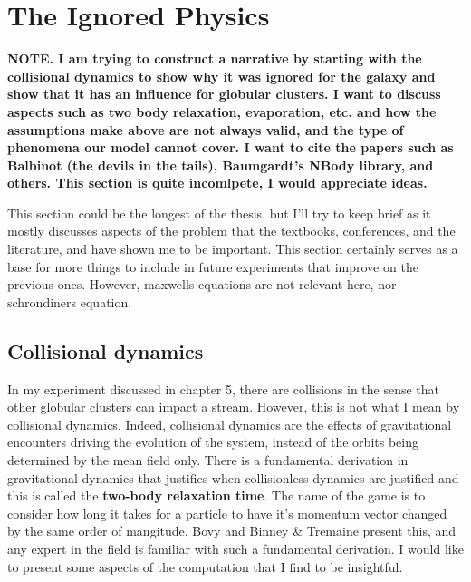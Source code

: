 \section{The Ignored Physics} \label{sec:ignoredphysics}


    \textbf{NOTE. I am trying to construct a narrative by starting with the collisional dynamics to show why it was ignored for the galaxy and show that it has an influence for globular clusters. I want to discuss aspects such as two body relaxation, evaporation, etc. and how the assumptions make above are not always valid, and the type of phenomena our model cannot cover. I want to cite the papers such as Balbinot (the devils in the tails), Baumgardt's NBody library, and others. This section is quite incomlpete, I would appreciate ideas.}
    
    This section could be the longest of the thesis, but I'll try to keep brief as it mostly discusses aspects of the problem that the textbooks, conferences, and the literature, and have shown me to be important. This section certainly serves as a base for more things to include in future experiments that improve on the previous ones. However, maxwells equations are not relevant here, nor schrondiners equation. 
        


    \subsection{Collisional dynamics} \label{sec:collisionalDynamics}

        In my experiment discussed in chapter 5, there are collisions in the sense that other globular clusters can impact a stream. However, this is not what I mean by collisional dynamics. Indeed, collisional dynamics are the effects of gravitational encounters driving the evolution of the system, instead of the orbits being determined by the mean field only. There is a fundamental derivation in gravitational dynamics that justifies when collisionless dynamics are justified and this is called the \textbf{two-body relaxation time}. The name of the game is to consider how long it takes for a particle to have it's momentum vector changed by the same order of mangitude. Bovy and Binney \& Tremaine present this, and any expert in the field is familiar with such a fundamental derivation. I would like to present some aspects of the computation that I find to be insightful. 

